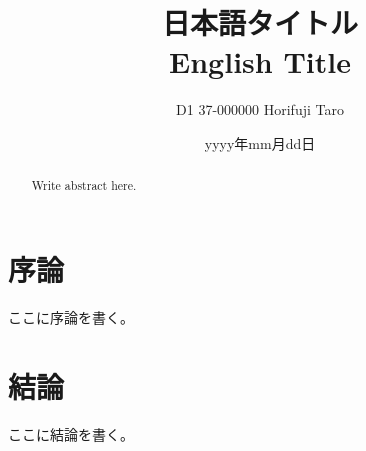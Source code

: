 \documentclass[platex,ja=standard,10pt,a4paper,oneside,twocolumn,fleqn,dvipdfmx]{bxjsarticle} %
\date{yyyy年mm月dd日}
\title{日本語タイトル\\ English Title}
\author{D1 37-000000 Horifuji Taro}
\affiliation{Hori \& Fujimoto Laboratory\\Department of Electrical Engineering}
\makeatletter
\newcommand{\eeistitle}{
    \twocolumn[
        \centering{
            \framebox[\linewidth]{
                \parbox{\linewidth-2ex}{
                \@documentname\hfill\@date
                \begin{center}
                    \Large{\textbf{\@title}}
                \end{center}
                \@affiliation \hfill \@author
                }
            }
        }
        \vskip 2ex
        \ifvoid\@abstractbox\else\centerline{\box\@abstractbox}
        \vskip 4ex
    ]
}
\makeatother
\begin{document}
\begin{abstract}
Write abstract here.
\end{abstract}

\eeistitle %
\thispagestyle{fancy}

\section{序論}
ここに序論を書く。

\section{結論}
ここに結論を書く。


\end{document}
